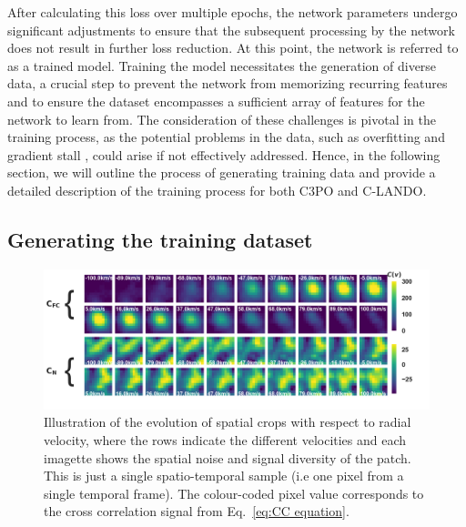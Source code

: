 \documentclass{aa}
\begin{document}
After calculating this loss over multiple epochs, the network parameters undergo significant adjustments to ensure that the subsequent processing by the network does not result in further loss reduction. At this point, the network is referred to as a trained model.
Training the model necessitates the generation of diverse data, a crucial step to prevent the network from memorizing recurring features and to ensure the dataset encompasses a sufficient array of features for the network to learn from. The consideration of these challenges is pivotal in the training process, as the potential problems in the data, such as overfitting \citep[][]{dietterich1995overfitting} and gradient stall \citep[][]{patel2017sgd}, could arise if not effectively addressed.
Hence, in the following section, we will outline the process of generating training data and provide a detailed description of the training process for both C3PO and C-LANDO.

\subsection{Generating the training dataset}

\begin{figure}[t]
    \includegraphics[width=\textwidth]{fig_2_dec2023_aligned_cropped.png}
    \caption{%
    Illustration of the evolution of spatial crops with respect to radial velocity, where the rows indicate the different velocities and each imagette shows the spatial noise and signal diversity of the patch. 
    This is just a single spatio-temporal sample (i.e one pixel from a single temporal frame).
    The colour-coded pixel value corresponds to the cross correlation signal from Eq.~\ref{eq:CC equation}. 
    }
    \label{fig:fig-2}
\end{figure}
\end{document}
